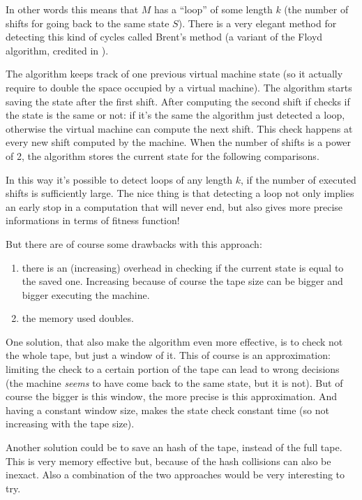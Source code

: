 \documentclass{report}
\begin{document}
In other words this means that $M$ has a ``loop'' of some length $k$ (the number of shifts for going back to the same state $S$). There is a very elegant method for detecting this kind of cycles called Brent's method \cite{brent} (a variant of the Floyd algorithm, credited in \cite{knuth}).

The algorithm keeps track of one previous virtual machine state (so it actually require to double the space occupied by a virtual machine). The algorithm starts saving the state after the first shift. After computing the second shift if checks if the state is the same or not: if it's the same the algorithm just detected a loop, otherwise the virtual machine can compute the next shift. This check happens at every new shift computed by the machine. When the number of shifts is a power of 2, the algorithm stores the current state for the following comparisons.

In this way it's possible to detect loops of any length $k$, if the number of executed shifts is sufficiently large. The nice thing is that detecting a loop not only implies an early stop in a computation that will never end, but also gives more precise informations in terms of fitness function!

But there are of course some drawbacks with this approach:
\begin{enumerate}
\item there is an (increasing) overhead in checking if the current state is equal to the saved one. Increasing because of course the tape size can be bigger and bigger executing the machine.
\item the memory used doubles.
\end{enumerate}

One solution, that also make the algorithm even more effective, is to check not the whole tape, but just a window of it. This of course is an approximation: limiting the check to a certain portion of the tape can lead to wrong decisions (the machine \textit{seems} to have come back to the same state, but it is not).
But of course the bigger is this window, the more precise is this approximation. And having a constant window size, makes the state check constant time (so not increasing with the tape size).

Another solution could be to save an hash of the tape, instead of the full tape. This is very memory effective but, because of the hash collisions can also be inexact. Also a combination of the two approaches would be very interesting to try.





\end{document}
